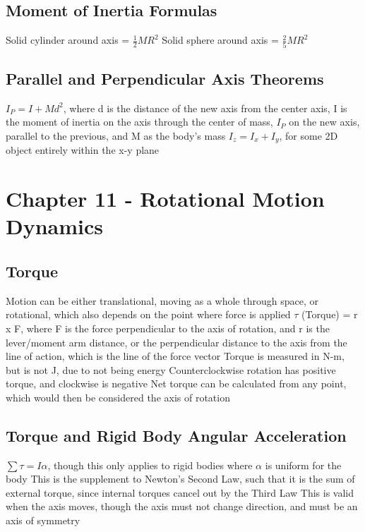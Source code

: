 \documentclass[11 pt, twoside]{article}
\newenvironment{outline*}
{
	\begin{outline}[enumerate]
	}
	{\end{outline}
}
\begin{document}
\subsection{Moment of Inertia Formulas}
\begin{outline*}
\1 Solid cylinder around axis = $\frac{1}{2}MR^2$
\1 Solid sphere around axis = $\frac{2}{5}MR^2$
\end{outline*}
\subsection{Parallel and Perpendicular Axis Theorems}
\begin{outline*}
\1 $I_P = I + Md^2$, where d is the distance of the new axis from the center axis, I is the moment of inertia on the axis through the center of mass, $I_P$ on the new axis, parallel to the previous, and M as the body’s mass
\1 $I_z = I_x + I_y$, for some 2D object entirely within the x-y plane
\end{outline*}
\section{Chapter 11 - Rotational Motion Dynamics}
\subsection{Torque}
\begin{outline*}
\1 Motion can be either translational, moving as a whole through space, or rotational, which also depends on the point where force is applied
\1 $\tau$ (Torque) = r x F, where F is the force perpendicular to the axis of rotation, and r is the lever/moment arm distance, or the perpendicular distance to the axis from the line of action, which is the line of the force vector
\2 Torque is measured in N-m, but is not J, due to not being energy
\2 Counterclockwise rotation has positive torque, and clockwise is negative
\2 Net torque can be calculated from any point, which would then be considered the axis of rotation
\end{outline*}
\subsection{Torque and Rigid Body Angular Acceleration}
\begin{outline*}
\1 $\sum \tau = I\alpha$, though this only applies to rigid bodies where $\alpha$ is uniform for the body
\2 This is the supplement to Newton’s Second Law, such that it is the sum of external torque, since internal torques cancel out by the Third Law
\2 This is valid when the axis moves, though the axis must not change direction, and must be an axis of symmetry
\end{outline*}
\end{document}
